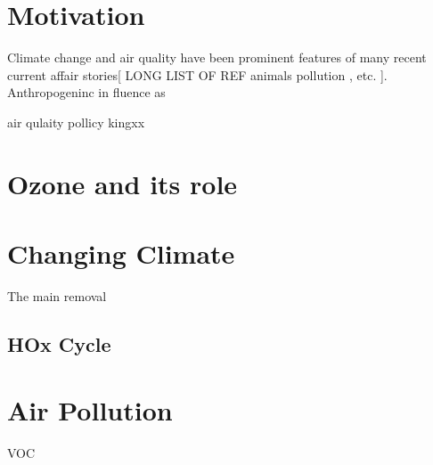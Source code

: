 \section{Motivation}

Climate change and air quality have been prominent features of many recent current affair stories[ LONG LIST OF REF animals pollution , etc. ]. Anthropogeninc in fluence as 


air qulaity pollicy 
kingxx



\section{Ozone and its role}






\section{Changing Climate}



The main removal 

\subsection{HOx Cycle}








\section{Air Pollution}

VOC 
